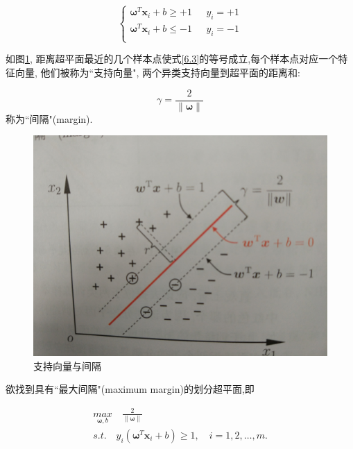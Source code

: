 \documentclass[12pt]{article}
\numberwithin{equation}{section}%
\begin{document}
\begin{equation}
\label{6-3}
 \left\{ \begin{array}{ll}
 \boldsymbol{\omega}^{T}\boldsymbol{x}_{i}+b \geqslant +1 & \textrm{ $y_{i}=+1$}\\
\boldsymbol{\omega}^{T}\boldsymbol{x}_{i}+b \leqslant -1  &  \textrm{ $y_{i}=-1$}\\
\end{array} \right.
\end{equation}

如图\ref{6-2}, 距离超平面最近的几个样本点使式\ref{6.3}的等号成立,每个样本点对应一个特征向量, 他们被称为``支持向量", 两个异类支持向量到超平面的距离和:

\begin{equation}
\gamma=\frac{2}{\parallel \boldsymbol{\omega} \parallel}
\end{equation}
称为``间隔"(margin).
\begin{figure}
\centering\includegraphics[width=5in]{6-2.jpg}
\caption{支持向量与间隔}
\label{6-2}
\end{figure}

欲找到具有``最大间隔"(maximum margin)的划分超平面,即



\begin{equation}
\begin{split}        %
 {\underset{\boldsymbol{\omega},b}{max}} \quad \frac{2}{\parallel \boldsymbol{\omega} \parallel}  \\
 s.t. \quad y_{i}(\boldsymbol{\omega}^{T}\boldsymbol{x}_{i}+b) \geqslant 1, \quad i= 1,2, \ldots ,m.
\end{split}
\label{6-5}
\end{equation}
\end{document}
